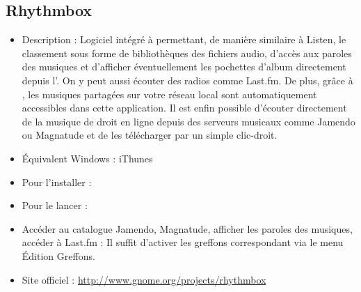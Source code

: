 \subsection{Rhythmbox}
\label{RefInstallRhythmbox}
\begin{itemize}
\begingroup
{}
\item Description : Logiciel intégré à  permettant, de manière similaire à Listen, le classement sous forme de bibliothèques des fichiers audio, d'accès aux paroles des musiques et d'afficher éventuellement les pochettes d'album directement depuis l'. On y peut aussi écouter des radios comme Last.fm. De plus, grâce à , les musiques partagées sur votre réseau local sont automatiquement accessibles dans cette application. Il est enfin possible d'écouter directement de la musique  de droit en ligne depuis des serveurs musicaux comme Jamendo ou Magnatude et de les télécharger par un simple clic-droit.{\par}
\item Équivalent Windows : iThunes
\endgroup
\item Pour l'installer : 
\item Pour le lancer : 
\item Accéder au catalogue Jamendo, Magnatude, afficher les paroles des musiques, accéder à Last.fm : Il suffit d'activer les greffons correspondant via le menu Édition \FlecheDroite Greffons.{\par}
\item Site officiel : \url{http://www.gnome.org/projects/rhythmbox}{\par}
\end{itemize}
